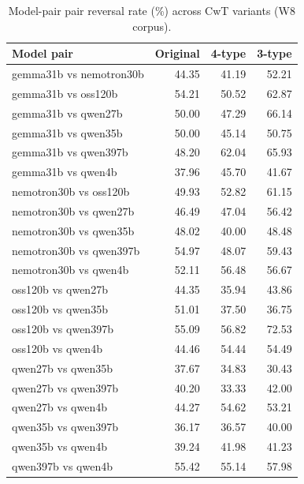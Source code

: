\begin{table}[htbp]
\centering\small
\caption{Model-pair pair reversal rate (\%) across CwT variants (W8 corpus).}
\label{tab:phase1h_modelpair_w8}
\begin{tabular}{lrrr}
\toprule
Model pair & Original & 4-type & 3-type \\
\midrule
  gemma31b vs nemotron30b & 44.35 & 41.19 & 52.21 \\
  gemma31b vs oss120b & 54.21 & 50.52 & 62.87 \\
  gemma31b vs qwen27b & 50.00 & 47.29 & 66.14 \\
  gemma31b vs qwen35b & 50.00 & 45.14 & 50.75 \\
  gemma31b vs qwen397b & 48.20 & 62.04 & 65.93 \\
  gemma31b vs qwen4b & 37.96 & 45.70 & 41.67 \\
  nemotron30b vs oss120b & 49.93 & 52.82 & 61.15 \\
  nemotron30b vs qwen27b & 46.49 & 47.04 & 56.42 \\
  nemotron30b vs qwen35b & 48.02 & 40.00 & 48.48 \\
  nemotron30b vs qwen397b & 54.97 & 48.07 & 59.43 \\
  nemotron30b vs qwen4b & 52.11 & 56.48 & 56.67 \\
  oss120b vs qwen27b & 44.35 & 35.94 & 43.86 \\
  oss120b vs qwen35b & 51.01 & 37.50 & 36.75 \\
  oss120b vs qwen397b & 55.09 & 56.82 & 72.53 \\
  oss120b vs qwen4b & 44.46 & 54.44 & 54.49 \\
  qwen27b vs qwen35b & 37.67 & 34.83 & 30.43 \\
  qwen27b vs qwen397b & 40.20 & 33.33 & 42.00 \\
  qwen27b vs qwen4b & 44.27 & 54.62 & 53.21 \\
  qwen35b vs qwen397b & 36.17 & 36.57 & 40.00 \\
  qwen35b vs qwen4b & 39.24 & 41.98 & 41.23 \\
  qwen397b vs qwen4b & 55.42 & 55.14 & 57.98 \\
\bottomrule
\end{tabular}
\end{table}
